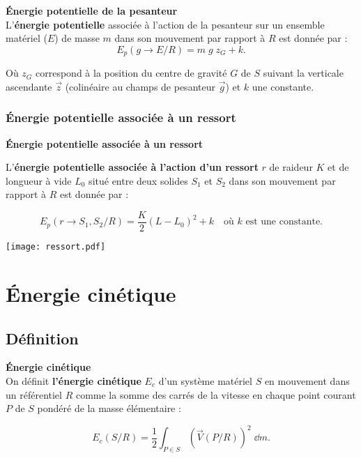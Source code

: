 \begin{defi}\textbf{Énergie potentielle de la pesanteur}\\
L'\textbf{énergie potentielle} associée à l'action de la pesanteur sur un ensemble matériel ($E$) de masse $m$ dans son mouvement par rapport à $R$ est donnée par :
$$
E_p(g \rightarrow E/R)=m\;g\;z_G + k.
$$

Où $z_G$ correspond à la position du centre de gravité $G$ de $S$ suivant la verticale ascendante $\overrightarrow{z}$ (colinéaire au champs de pesanteur $\overrightarrow{g}$) et $k$ une constante.

\end{defi}



\subsubsection{Énergie potentielle associée à un ressort}

\begin{defi}\textbf{Énergie potentielle associée à un ressort}
~\\

\begin{minipage}[c]{.65\linewidth}
L'\textbf{énergie potentielle associée à l'action d'un ressort} $r$ de raideur $K$ et de longueur à vide $L_0$ situé entre deux solides $S_1$ et $S_2$ dans son mouvement par rapport à $R$ est donnée par :

$$
E_p(r \rightarrow S_1,S_2/R)=\frac{K}{2}(L-L_0)^2+k \quad \text{où }k\text{ est une constante}.
$$
\end{minipage} 
\hfill
\begin{minipage}[c]{.3\linewidth}
\begin{center}
\texttt{[image: ressort.pdf]}
\end{center}
\end{minipage}
\end{defi}



\section{Énergie cinétique}
\subsection{Définition}
\begin{defi}\textbf{Énergie cinétique}\\
On définit \textbf{l'énergie cinétique} $E_c$ d'un système matériel $S$ en mouvement dans un référentiel $R$ comme la somme des carrés de la vitesse en chaque point courant $P$ de $S$ pondéré de la masse élémentaire :

$$
E_c(S/R)=\frac{1}{2}\displaystyle{\int_{P\in S}} \left(\overrightarrow{V}(P/R)\right)^2\;\dd m.
$$

\end{defi}

